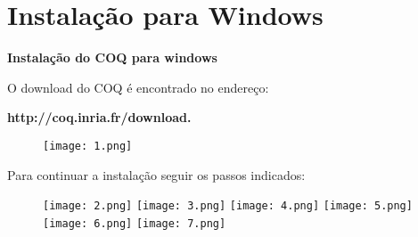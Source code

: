 \section{Instala\c{c}\~ao para Windows}
\begin{center}
{\textbf {Instala\c{c}\~{a}o do COQ para windows }}\\
\end{center}
\begin{flushleft}
O download do COQ \'{e} encontrado no endere\c{c}o: \begin{center}\textbf{http://coq.inria.fr/download.}\\
\end{center}
\begin{figure}[!htb]
\centering
\texttt{[image: 1.png]}
\end{figure}
Para continuar a instala\c{c}\~{a}o seguir os passos indicados:\\
\begin{figure}[!htb]
\texttt{[image: 2.png]} 
\texttt{[image: 3.png]}
\texttt{[image: 4.png]}
\texttt{[image: 5.png]} 
\texttt{[image: 6.png]}  
\texttt{[image: 7.png]} 
\end{figure}
\end{flushleft} 
